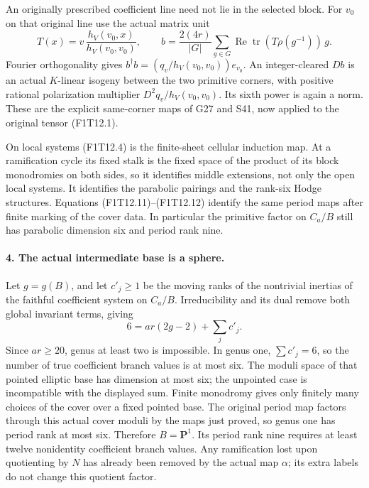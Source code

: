 An originally prescribed coefficient line need not lie in
the selected block. For \(v_0\) on that original line use
the actual matrix unit
\[
 T(x)=v\,\frac{h_V(v_0,x)}{h_V(v_0,v_0)},\qquad
 b=\frac{2(4r)}{|G|}
   \sum_{g\in G}\operatorname{Re}
      \operatorname{tr}(T\rho(g^{-1}))\,g .
 \tag{F1T12.12}
\]
Fourier orthogonality gives
\(b^\dagger b=(q_v/h_V(v_0,v_0))e_{v_0}\).
An integer-cleared \(Db\) is an actual \(K\)-linear
isogeny between the two primitive corners, with positive
rational polarization multiplier
\(D^2q_v/h_V(v_0,v_0)\). Its sixth power is again a norm.
These are the explicit same-corner maps of G27 and S41,
now applied to the original tensor (F1T12.1).

On local systems (F1T12.4) is the finite-sheet cellular
induction map. At a ramification cycle its fixed stalk is
the fixed space of the product of its block monodromies
on both sides, so it identifies middle extensions, not
only the open local systems. It identifies the parabolic
pairings and the rank-six Hodge structures. Equations
(F1T12.11)--(F1T12.12) identify the same period maps after
finite marking of the cover data. In particular the
primitive factor on \(C_a/B\) still has parabolic
dimension six and period rank nine.

\paragraph{4. The actual intermediate base is a sphere.}
Let \(g=g(B)\), and let \(c'_j\ge1\) be the moving ranks
of the nontrivial inertias of the faithful coefficient
system on \(C_a/B\). Irreducibility and its dual remove
both global invariant terms, giving
\[
                       6=ar(2g-2)+\sum_j c'_j .
 \tag{F1T12.13}
\]
Since \(ar\ge20\), genus at least two is impossible.
In genus one, \(\sum c'_j=6\), so the number of true
coefficient branch values is at most six. The moduli
space of that pointed elliptic base has dimension at most
six; the unpointed case is incompatible with the displayed
sum. Finite monodromy gives only finitely many choices of
the cover over a fixed pointed base. The original period
map factors through this actual cover moduli by the maps
just proved, so genus one has period rank at most six.
Therefore \(B=\mathbf P^1\). Its period rank nine requires
at least twelve nonidentity coefficient branch values.
Any ramification lost upon quotienting by \(N\) has already
been removed by the actual map \(\alpha\); its extra labels
do not change this quotient factor.

